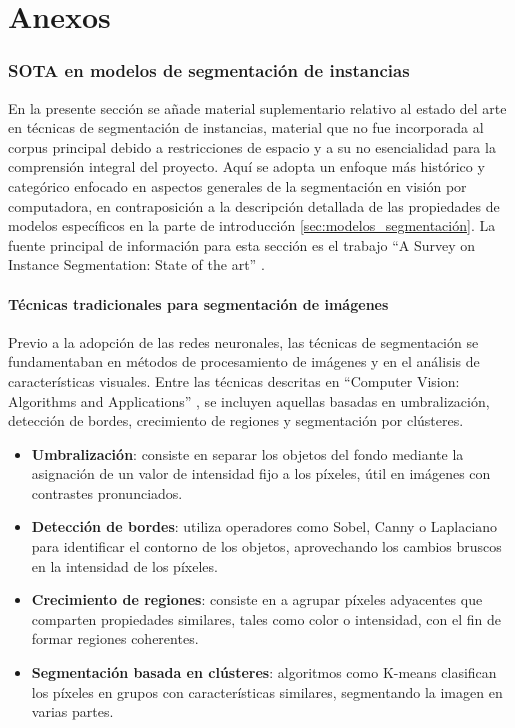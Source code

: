 \part*{Anexos}
\label{part:anexo}
\section[SOTA en modelos de segmentación de instancias]{SOTA en modelos de segmentación de instancias}
En la presente sección se añade material suplementario relativo al estado del arte en técnicas de segmentación de instancias, material que no fue incorporada al corpus principal debido a restricciones de espacio y a su no esencialidad para la comprensión integral del proyecto. Aquí se adopta un enfoque más histórico y categórico enfocado en aspectos generales de la segmentación en visión por computadora, en contraposición a la descripción detallada de las propiedades de modelos específicos en la parte de introducción \ref{sec:modelos_segmentación}. La fuente principal de información para esta sección es el trabajo \enquote{A Survey on Instance Segmentation: State of the art} \cite[Hafiz y Bhat 2020]{Hafiz2020}.

\subsection{Técnicas tradicionales para segmentación de imágenes}
Previo a la adopción de las redes neuronales, las técnicas de segmentación se fundamentaban en métodos de procesamiento de imágenes y en el análisis de características visuales. Entre las técnicas descritas en \enquote{Computer Vision: Algorithms and Applications} \cite[Szeliski 2022]{Szeliski2022}, se incluyen aquellas basadas en umbralización, detección de bordes, crecimiento de regiones y segmentación por clústeres.

\begin{itemize}
\setlength\itemsep{-0.3em}
    \item \textbf{Umbralización}: consiste en separar los objetos del fondo mediante la asignación de un valor de intensidad fijo a los píxeles, útil en imágenes con contrastes pronunciados.
    \item \textbf{Detección de bordes}: utiliza operadores como Sobel, Canny o Laplaciano para identificar el contorno de los objetos, aprovechando los cambios bruscos en la intensidad de los píxeles.
    \item \textbf{Crecimiento de regiones}: consiste en a agrupar píxeles adyacentes que comparten propiedades similares, tales como color o intensidad, con el fin de formar regiones coherentes.
    \item \textbf{Segmentación basada en clústeres}: algoritmos como K-means clasifican los píxeles en grupos con características similares, segmentando la imagen en varias partes.
\end{itemize}

